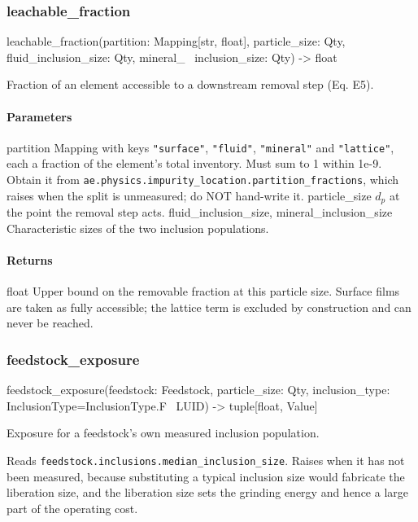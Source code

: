 \documentclass[10pt,a4paper,twoside]{report}
\begin{document}
\subsubsection*{leachable\_fraction}

\begin{verbatimsmall}
leachable_fraction(partition: Mapping[str, float], particle_size: Qty, fluid_inclusion_size: Qty, mineral_
    \ inclusion_size: Qty) -> float
\end{verbatimsmall}

Fraction of an element accessible to a downstream removal step (Eq. E5).

\paragraph*{Parameters}

partition Mapping with keys \texttt{"surface"}, \texttt{"fluid"}, \texttt{"mineral"} and \texttt{"lattice"}, each a fraction of the element's total inventory. Must sum to 1 within 1e-9. Obtain it from \texttt{ae.physics.impurity\_location.partition\_fractions}, which raises when the split is unmeasured; do NOT hand-write it. particle\_size $d_p$ at the point the removal step acts. fluid\_inclusion\_size, mineral\_inclusion\_size Characteristic sizes of the two inclusion populations.

\paragraph*{Returns}

float Upper bound on the removable fraction at this particle size. Surface films are taken as fully accessible; the lattice term is excluded by construction and can never be reached.

\subsubsection*{feedstock\_exposure}

\begin{verbatimsmall}
feedstock_exposure(feedstock: Feedstock, particle_size: Qty, inclusion_type: InclusionType=InclusionType.F
    \ LUID) -> tuple[float, Value]
\end{verbatimsmall}

Exposure for a feedstock's own measured inclusion population.

Reads \texttt{feedstock.inclusions.median\_inclusion\_size}. Raises when it has not been measured, because substituting a typical inclusion size would fabricate the liberation size, and the liberation size sets the grinding energy and hence a large part of the operating cost.
\end{document}
